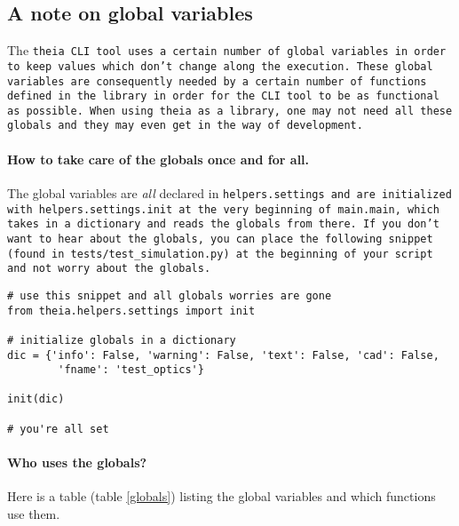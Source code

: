 \documentclass{article}
\begin{document}
\subsection{A note on global variables}
The \tt{theia} CLI tool uses a certain number of global variables in order to keep values which don't change along the execution. These global variables are consequently needed by a certain number of functions defined in the library in order for the CLI tool to be as functional as possible. When using \tt{theia} as a library, one may not need all these globals and they may even get in the way of development.

\paragraph{How to take care of the globals once and for all.}The global variables are \textit{all} declared in \tt{helpers.settings} and are initialized with \tt{helpers.settings.init} at the very beginning of \tt{main.main}, which takes in a dictionary and reads the globals from there. If you don't want to hear about the globals, you can place the following snippet (found in \tt{tests/test\_simulation.py}) at the beginning of your script and not worry about the globals.

\begin{lstlisting}
# use this snippet and all globals worries are gone
from theia.helpers.settings import init

# initialize globals in a dictionary
dic = {'info': False, 'warning': False, 'text': False, 'cad': False,
		'fname': 'test_optics'}

init(dic)

# you're all set 
\end{lstlisting}

\paragraph{Who uses the globals?}Here is a table (table \ref{globals}) listing the global variables and which functions use them.
\end{document}

